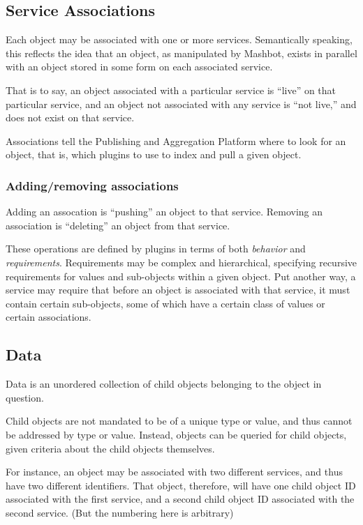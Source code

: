 \documentclass{report}
\begin{document}
		\subsection{Service Associations}
			Each object may be associated with one or more services.
			Semantically speaking, this reflects the idea that an object, as 
			manipulated by Mashbot, exists in parallel with an object stored in 
			some form on each associated service.

			That is to say, an object associated with a particular service is 
			``live'' on that particular service, and an object not associated 
			with any service is ``not live,'' and does not exist on that 
			service.

			Associations tell the Publishing and Aggregation Platform where to 
			look for an object, that is, which plugins to use to index and pull 
			a given object.

			\subsubsection{Adding/removing associations}
				Adding an assocation is ``pushing'' an object to that service.  
				Removing an association is ``deleting'' an object from that
				service.  
				
				These operations are defined by plugins in terms of both
				\emph{behavior} and \emph{requirements}. Requirements may be
				complex and hierarchical, specifying recursive requirements for 
				values and sub-objects within a given object. Put another way,
				a service may require that before an object is associated with 
				that service, it must contain certain sub-objects, some of which
				have a certain class of values or certain associations.
			
		\subsection{Data}
			Data is an unordered collection of child objects belonging to the 
			object in question.

			Child objects are not mandated to be of a unique type or value, and 
			thus cannot be addressed by type or value. Instead, objects can be 
			queried for child objects, given criteria about the child objects 
			themselves.

			For instance, an object may be associated with two different 
			services, and thus have two different identifiers. That object, 
			therefore, will have one child object ID associated with the first 
			service, and a second child object ID associated with the second 
service. (But the numbering here is arbitrary)
\end{document}
